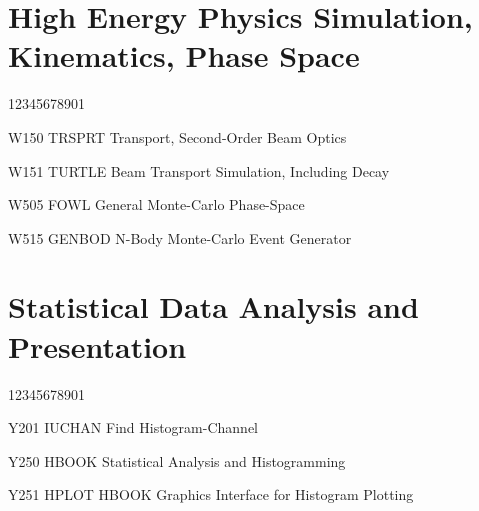 \section*{High Energy Physics Simulation, Kinematics, Phase Space}
\begin{DLtt}{12345678901}
\item[W150 TRSPRT] Transport, Second-Order Beam Optics
\item[W151 TURTLE] Beam Transport Simulation, Including Decay
\item[W505 FOWL] General Monte-Carlo Phase-Space
\item[W515 GENBOD] N-Body Monte-Carlo Event Generator
\end{DLtt}
\section*{Statistical Data Analysis and Presentation}
\begin{DLtt}{12345678901}
\item[Y201 IUCHAN] Find Histogram-Channel
\item[Y250 HBOOK] Statistical Analysis and Histogramming
\item[Y251 HPLOT] HBOOK Graphics Interface for Histogram Plotting
\end{DLtt}
